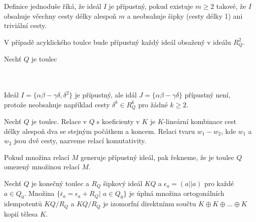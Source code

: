     \begin{pzn}
      Definice jednoduše říká, že ideál $I$ je přípustný, pokud existuje $m\geq 2$ 
      takové, že $I$ obsahuje včechny cesty délky alespoň $m$ a neobsahuje šipky 
      (cesty délky 1) ani triviální cesty.
      
      V případě acyklického toulce bude přípustný každý ideál obsažený v ideálu 
      $R_Q^2$.
    \end{pzn}
    
    \begin{pr}
      Nechť $Q$ je toulec   \\
      \centerline{}\\\\
      Ideál $I=\{\alpha\beta-\gamma\delta,\delta^2\}$ je přípustný, ale idál 
      $J=\{\alpha\beta-\gamma\delta\}$ přípustný není, protože neobsahuje například 
      cesty $\delta^k\in R_Q^k$ pro žádné $k\geq 2$.
    \end{pr} 
    
    \begin{dfn}
      Nechť $Q$ je toulec. Relace v $Q$ s koeficienty v $K$ je $K$-lineární 
      kombinace cest délky alespoň dva se stejným počátkem a koncem.       
      Relaci tvaru $w_1-w_2$, kde $w_1$ a $w_2$ jsou dvě cesty, nazveme relací komutativity. 
      
      Pokud množina relací $M$ generuje přípustný ideál, pak řekneme, že je toulec 
      $Q$ omezený množinou relací $M$.
    \end{dfn}
    
    \begin{lem}\label{lem-kq-jako-soucin}
      Nechť $Q$ je konečný toulec a $R_Q$ šipkový ideál $KQ$ a $\epsilon_a=(a||a)$ 
      pro každé $a\in Q_0$. Množina $\{\bar\epsilon_a=\epsilon_a+R_Q|$ $a\in Q_0\}$ 
      je úplná množina ortogonálních idempotentů $KQ/R_Q$ a $KQ/R_Q$ je 
      izomorfní direktnímu součtu $K\oplus K\oplus\ldots\oplus K$ 
      kopií tělesa $K$.
    \end{lem}
    
